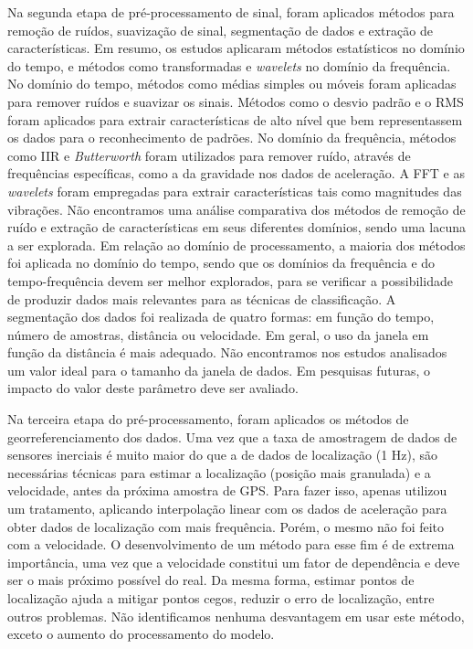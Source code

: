 Na segunda etapa de pré-processamento de sinal, foram aplicados métodos para remoção de ruídos, suavização de sinal, segmentação de dados e extração de características. Em resumo, os estudos aplicaram métodos estatísticos no domínio do tempo, e métodos como transformadas e \textit{wavelets} no domínio da frequência. No domínio do tempo, métodos como médias simples ou móveis foram aplicadas para remover ruídos e suavizar os sinais. Métodos como o desvio padrão e o RMS foram aplicados para extrair características de alto nível que bem representassem os dados para o reconhecimento de padrões. No domínio da frequência, métodos como IIR e \textit{Butterworth} foram utilizados para remover ruído, através de frequências específicas, como a da gravidade nos dados de aceleração. A FFT e as \textit{wavelets} foram empregadas para extrair características tais como magnitudes das vibrações. Não encontramos uma análise comparativa dos métodos de remoção de ruído e extração de características em seus diferentes domínios, sendo uma lacuna a ser explorada. Em relação ao domínio de processamento, a maioria dos métodos foi aplicada no domínio do tempo, sendo que os domínios da frequência e do tempo-frequência devem ser melhor explorados, para se verificar a possibilidade de produzir dados mais relevantes para as técnicas de classificação. A segmentação dos dados foi realizada de quatro formas: em função do tempo, número de amostras, distância ou velocidade. Em geral, o uso da janela em função da distância é mais adequado. Não encontramos nos estudos analisados um valor ideal para o tamanho da janela de dados. Em pesquisas futuras, o impacto do valor deste parâmetro deve ser avaliado.

Na terceira etapa do pré-processamento, foram aplicados os métodos de georreferenciamento dos dados. Uma vez que a taxa de amostragem de dados de sensores inerciais é muito maior do que a de dados de localização (1 Hz), são necessárias técnicas para estimar a localização (posição mais granulada) e a velocidade, antes da próxima amostra de GPS. Para fazer isso, apenas  utilizou um tratamento, aplicando interpolação linear com os dados de aceleração para obter dados de localização com mais frequência. Porém, o mesmo não foi feito com a velocidade. O desenvolvimento de um método para esse fim é de extrema importância, uma vez que a velocidade constitui um fator de dependência e deve ser o mais próximo possível do real. Da mesma forma, estimar pontos de localização ajuda a mitigar pontos cegos, reduzir o erro de localização, entre outros problemas. Não identificamos nenhuma desvantagem em usar este método, exceto o aumento do processamento do modelo.

